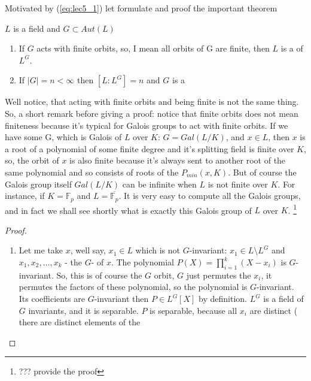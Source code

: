 Motivated by (\ref{eq:lec5_1}) let formulate and proof the important
theorem
\begin{theorem}[Artin]
  $L$ is a field and $G \subset Aut\left(L\right)$
  \begin{enumerate}
  \item If $G$ acts with finite orbits,  so, I mean all orbits of G
    are finite, then $L$ is a  of $L^G$.
  \item If $\left|G\right| = n < \infty$ then
    $\left[L : L^G\right] = n$ and $G$ is a 
  \end{enumerate}

  \begin{remark}
    Well notice, that acting with finite orbits  and being finite is not
    the same thing. So, a short remark before giving a proof: notice
    that finite orbits does not mean finiteness because it's typical for
    Galois groups to act with finite orbits.  If we have some G, which
    is Galois of $L$ over $K$: $G = Gal\left(L/K\right)$, and
    $x \in L$, then $x$ is a root of a 
    polynomial of some finite degree  and it's splitting field is
    finite over $K$, so, the orbit of $x$ is also finite 
    because it's always sent to another root of the
    same polynomial and so consists of roots of  the
    $P_{min}\left(x, K\right)$. But of course the Galois group itself
    $Gal\left(L/K\right)$ can be infinite when $L$ is not finite over $K$. For
    instance, if  $K  = \mathbb{F}_p$ and $L = \overline{\mathbb{F}_p}$. It is
    very easy to compute all the Galois groups, and in fact we shall see
    shortly what is exactly this Galois group of $L$ over $K$.
    \footnote{
      ??? provide the proof
    }
  \end{remark}
  \begin{proof}
    \begin{enumerate}
    \item  Let me take $x$, well say, $x_1 \in L$ which is not
      $G$-invariant: $x_1 \in L \setminus L^G$ and
      $x_1, x_2, \dots, x_k$ - the $G$- of $x$. The
      polynomial $P\left(X\right) = \prod_{i=1}^k\left(X - x_i\right)$
      is $G$-invariant. So, this is of course the $G$ orbit, $G$ just
      permutes  the $x_i$, it permutes the factors of these polynomial,
      so the polynomial is $G$-invariant. Its coefficients are
      $G$-invariant then $P \in L^G\left[X\right]$ by definition. $L^G$
      is a field of $G$ invariants, and it is separable. $P$ is separable,
      because all $x_i$ are distinct ( there are distinct elements of the

\end{enumerate}
\end{proof}
\end{theorem}

